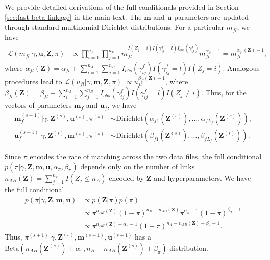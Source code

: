 \documentclass[ba,preprint]{imsart}
\begin{document}
	We provide detailed derivations of the full conditionals provided in Section \ref{sec:fast-beta-linkage} in the main text. The $\bm{m}$ and $\bm{u}$ parameters are updated through standard multinomial-Dirichlet distributions. For a particular $m_{fl}$, we have
	\begin{align}
		\mathcal{L}(m_{fl}|\gamma, \bm{u}, \bm{Z}, \pi) &\propto \prod_{i=1}^{n_A} \prod_{j=1}^{n_B} m_{fl}^{I(Z_j = i) I(\gamma_{ij}^f = l) I_{obs}(\gamma_{ij}^f)}  m_{fl}^{\alpha_{fl} - 1} = m_{fl}^{\alpha_{fl}(\bm{Z}) - 1},
	\end{align}
	where $\alpha_{fl}(\bm{Z})= \alpha_{fl} + \sum_{i=1}^{n_A}  \sum_{j=1}^{n_B} I_{obs}(\gamma_{ij}^f)I(\gamma_{ij}^f = l) I(Z_j = i)$. Analogous procedures lead to $\mathcal{L}(u_{fl}| \gamma, \bm{m}, \bm{Z}, \pi)$  $\propto u_{fl}^{\beta_{fl}(\bm{Z}) - 1}$, where $\beta_{fl}(\bm{Z})= \beta_{fl} + \sum_{i=1}^{n_A}  \sum_{j=1}^{n_B} I_{obs}(\gamma_{ij}^f)I(\gamma_{ij}^f = l) I(Z_j \neq i)$. Thus, for the vectors of parameters $\bm{m}_f$ and $\bm{u}_f$, we have
	\begin{align}
	\bm{m}_f^{(s+1)} |
	\gamma, 
	\bm{Z}^{(s)}, \bm{u}^{(s)}, \pi^{(s)} &\sim 
	\text{Dirichlet}(\alpha_{f1}(\bm{Z}^{(s)}), \ldots, \alpha_{fL_f}(\bm{Z}^{(s)})), \\
	\bm{u}_f^{(s+1)} | \gamma, \bm{Z}^{(s)}, \bm{m}^{(s)}, \pi^{(s)} &\sim \text{Dirichlet}(\beta_{f1}(\bm{Z}^{(s)}), \ldots, \beta_{fL_f}(\bm{Z}^{(s)})).
	\end{align}

	Since $\pi$ encodes the rate of matching across the two data files, the full conditional $p(\pi|\gamma, \bm{Z}, \bm{m}, \bm{u}, \alpha_{\pi}, \beta_{\pi})$ depends only on the number of links $n_{AB}(\bm{Z}) = \sum_{j=1}^{n_B}I(Z_j \leq n_A)$ encoded by $\bm{Z}$ and hyperparameters. We have the full conditional
	\begin{align}
		p(\pi |\gamma, \bm{Z}, \bm{m}, \bm{u}) &\propto p(\bm{Z}|\pi)p(\pi) \\
		&\propto \pi^{n_{AB}(\bm{Z})} (1-\pi)^{n_B - n_{AB}(\bm{Z})} \pi^{\alpha_{\pi} -1} (1-\pi)^{\beta_{\pi} -1} \\
		&\propto \pi^{n_{AB}(\bm{Z}) + \alpha_{\pi} - 1} (1-\pi)^{n_A - n_{AB}(\bm{Z}) + \beta_{\pi} -1}.
	\end{align}
	Thus, $\pi^{(s+1)}|\gamma, \bm{Z}^{(s)}, \bm{m}^{(s+1)}, \bm{u}^{(s+1)}$ has a $\text{Beta}(n_{AB}(\bm{Z}^{(s)}) + \alpha_{\pi}, n_B - n_{AB}(\bm{Z}^{(s)}) + \beta_{\pi})$ distribution.
	
\end{document}
